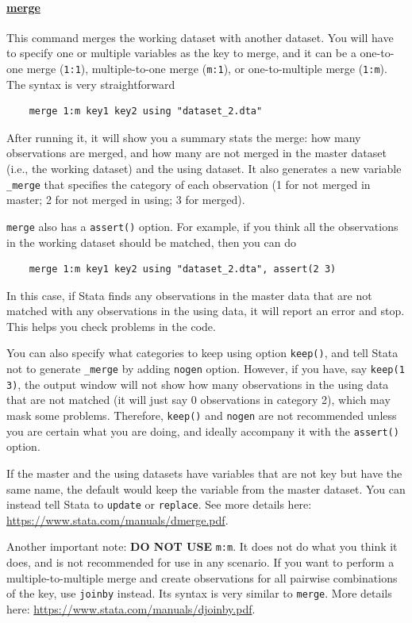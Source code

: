 \paragraph{\underline{merge}} This command merges the working dataset with another dataset. You will have to specify one or multiple variables as the key to merge, and it can be a one-to-one merge (\verb|1:1|), multiple-to-one merge (\verb|m:1|), or one-to-multiple merge (\verb|1:m|). The syntax is very straightforward
\begin{verbatim}
    merge 1:m key1 key2 using "dataset_2.dta"
\end{verbatim}
After running it, it will show you a summary stats the merge: how many observations are merged, and how many are not merged in the master dataset (i.e., the working dataset) and the using dataset. It also generates a new variable \verb|_merge| that specifies the category of each observation (1 for not merged in master; 2 for not merged in using; 3 for merged). 

\verb|merge| also has a \verb|assert()| option. For example, if you think all the observations in the working dataset should be matched, then you can do 
\begin{verbatim}
    merge 1:m key1 key2 using "dataset_2.dta", assert(2 3)
\end{verbatim}
In this case, if Stata finds any observations in the master data that are not matched with any observations in the using data, it will report an error and stop. This helps you check problems in the code. 

You can also specify what categories to keep using option \verb|keep()|, and tell Stata not to generate \verb|_merge| by adding \verb|nogen| option. However, if you have, say \verb|keep(1 3)|, the output window will not show how many observations in the using data that are not matched (it will just say 0 observations in category 2), which may mask some problems. Therefore, \verb|keep()| and \verb|nogen| are not recommended unless you are certain what you are doing, and ideally accompany it with the \verb|assert()| option. 

If the master and the using datasets have variables that are not key but have the same name, the default would keep the variable from the master dataset. You can instead tell Stata to \verb|update| or \verb|replace|. See more details here: \url{https://www.stata.com/manuals/dmerge.pdf}.

Another important note: \textbf{DO NOT USE} \verb|m:m|. It does not do what you think it does, and is not recommended for use in any scenario. If you want to perform a multiple-to-multiple merge and create observations for all pairwise combinations of the key, use \verb|joinby| instead. Its syntax is very similar to \verb|merge|. More details here: \url{https://www.stata.com/manuals/djoinby.pdf}.

